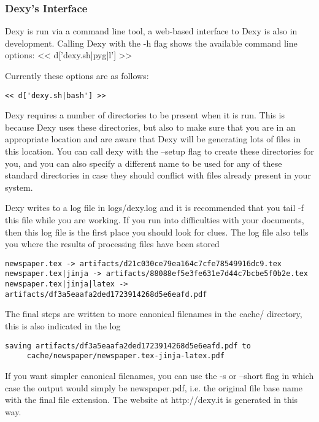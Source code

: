 \documentclass[custom, plainsections]{sciposter}
\begin{document}
\begin{multicols*}{2}
\subsubsection*{Dexy's Interface}

Dexy is run via a command line tool, a web-based interface to Dexy is also in development. Calling Dexy with the -h flag shows the available command line options:
\tiny
<< d['dexy.sh|pyg|l'] >>
\small

Currently these options are as follows:

\tiny
\begin{Verbatim}
<< d['dexy.sh|bash'] >>
\end{Verbatim}
\small

Dexy requires a number of directories to be present when it is run. This is because Dexy uses these directories, but also to make sure that you are in an appropriate location and are aware that Dexy will be generating lots of files in this location. You can call dexy with the --setup flag to create these directories for you, and you can also specify a different name to be used for any of these standard directories in case they should conflict with files already present in your system.

Dexy writes to a log file in logs/dexy.log and it is recommended that you tail -f this file while you are working. If you run into difficulties with your documents, then this log file is the first place you should look for clues. The log file also tells you where the results of processing files have been stored

\tiny
\begin{Verbatim}
newspaper.tex -> artifacts/d21c030ce79ea164c7cfe78549916dc9.tex
newspaper.tex|jinja -> artifacts/88088ef5e3fe631e7d44c7bcbe5f0b2e.tex
newspaper.tex|jinja|latex -> artifacts/df3a5eaafa2ded1723914268d5e6eafd.pdf
\end{Verbatim}
\small

The final steps are written to more canonical filenames in the cache/ directory, this is also indicated in the log

\tiny
\begin{Verbatim}
saving artifacts/df3a5eaafa2ded1723914268d5e6eafd.pdf to 
     cache/newspaper/newspaper.tex-jinja-latex.pdf
\end{Verbatim}
\small

If you want simpler canonical filenames, you can use the -s or --short flag in which case the output would simply be newspaper.pdf, i.e. the original file base name with the final file extension. The website at http://dexy.it is generated in this way.




\end{multicols*}
\end{document}
